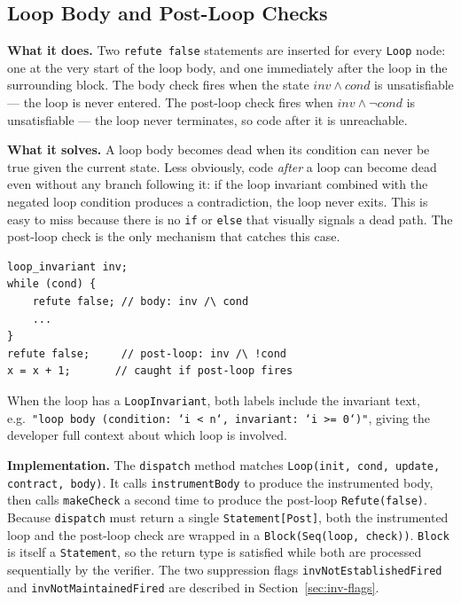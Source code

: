 \documentclass[9pt,a4paper,twocolumn]{article}
\begin{document}
\subsection{Loop Body and Post-Loop Checks}

\textbf{What it does.} Two \texttt{refute false} statements are
inserted for every \texttt{Loop} node: one at the very start of the
loop body, and one immediately after the loop in the surrounding
block. The body check fires when the state $\mathit{inv} \wedge
\mathit{cond}$ is unsatisfiable — the loop is never entered. The
post-loop check fires when $\mathit{inv} \wedge \neg\mathit{cond}$
is unsatisfiable — the loop never terminates, so code after it is
unreachable.

\textbf{What it solves.} A loop body becomes dead when its
condition can never be true given the current state. Less
obviously, code \emph{after} a loop can become dead even without
any branch following it: if the loop invariant combined with the
negated loop condition produces a contradiction, the loop never
exits. This is easy to miss because there is no \texttt{if} or
\texttt{else} that visually signals a dead path. The post-loop
check is the only mechanism that catches this case.

\begin{lstlisting}
loop_invariant inv;
while (cond) {
    refute false; // body: inv /\ cond
    ...
}
refute false;     // post-loop: inv /\ !cond
x = x + 1;       // caught if post-loop fires
\end{lstlisting}

When the loop has a \texttt{LoopInvariant}, both labels include
the invariant text, e.g.\ \texttt{"loop body (condition: `i < n`,
invariant: `i >= 0`)"}, giving the developer full context about
which loop is involved.

\textbf{Implementation.} The \texttt{dispatch} method matches
\texttt{Loop(init, cond, update, contract, body)}. It calls
\texttt{instrumentBody} to produce the instrumented body, then calls
\texttt{makeCheck} a second time to produce the post-loop
\texttt{Refute(false)}. Because \texttt{dispatch} must return a
single \texttt{Statement[Post]}, both the instrumented loop and the
post-loop check are wrapped in a \texttt{Block(Seq(loop, check))}.
\texttt{Block} is itself a \texttt{Statement}, so the return type
is satisfied while both are processed sequentially by the verifier.
The two suppression flags \texttt{invNotEstablishedFired} and
\texttt{invNotMaintainedFired} are described in
Section~\ref{sec:inv-flags}.
\end{document}

